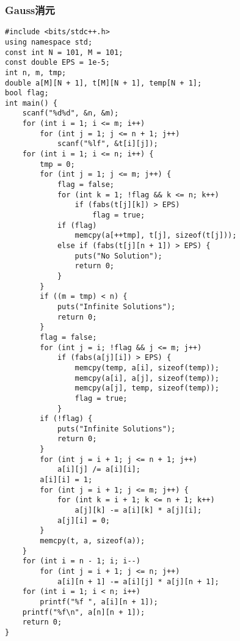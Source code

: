﻿\documentclass[a4paper]{article}
\begin{document}
\subsubsection{Gauss消元}
\begin{lstlisting}
#include <bits/stdc++.h>
using namespace std;
const int N = 101, M = 101;
const double EPS = 1e-5;
int n, m, tmp;
double a[M][N + 1], t[M][N + 1], temp[N + 1];
bool flag;
int main() {
    scanf("%d%d", &n, &m);
    for (int i = 1; i <= m; i++)
        for (int j = 1; j <= n + 1; j++)
            scanf("%lf", &t[i][j]);
    for (int i = 1; i <= n; i++) {
        tmp = 0;
        for (int j = 1; j <= m; j++) {
            flag = false;
            for (int k = 1; !flag && k <= n; k++)
                if (fabs(t[j][k]) > EPS)
                    flag = true;
            if (flag)
                memcpy(a[++tmp], t[j], sizeof(t[j]));
            else if (fabs(t[j][n + 1]) > EPS) {
                puts("No Solution");
                return 0;
            }
        }
        if ((m = tmp) < n) {
            puts("Infinite Solutions");
            return 0;
        }
        flag = false;
        for (int j = i; !flag && j <= m; j++)
            if (fabs(a[j][i]) > EPS) {
                memcpy(temp, a[i], sizeof(temp));
                memcpy(a[i], a[j], sizeof(temp));
                memcpy(a[j], temp, sizeof(temp));
                flag = true;
            }
        if (!flag) {
            puts("Infinite Solutions");
            return 0;
        }
        for (int j = i + 1; j <= n + 1; j++)
            a[i][j] /= a[i][i];
        a[i][i] = 1;
        for (int j = i + 1; j <= m; j++) {
            for (int k = i + 1; k <= n + 1; k++)
                a[j][k] -= a[i][k] * a[j][i];
            a[j][i] = 0;
        }
        memcpy(t, a, sizeof(a));
    }
    for (int i = n - 1; i; i--)
        for (int j = i + 1; j <= n; j++)
            a[i][n + 1] -= a[i][j] * a[j][n + 1];
    for (int i = 1; i < n; i++)
        printf("%f ", a[i][n + 1]);
    printf("%f\n", a[n][n + 1]);
    return 0;
}
\end{lstlisting}
\end{document}
